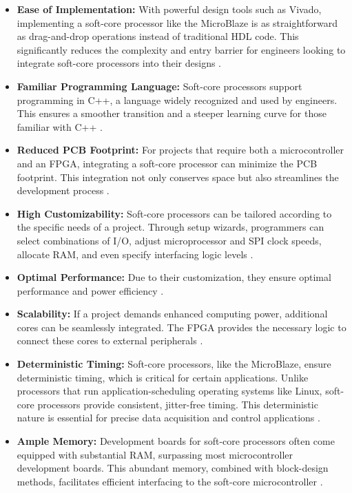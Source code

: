 \documentclass[conference]{IEEEtran}
\begin{document}
\begin{itemize}

 
\item \textbf{Ease of Implementation:} With powerful design tools such as Vivado, implementing a soft-core processor like the MicroBlaze is as straightforward as drag-and-drop operations instead of traditional HDL code. This significantly reduces the complexity and entry barrier for engineers looking to integrate soft-core processors into their designs \cite{3}.

\item \textbf{Familiar Programming Language:} Soft-core processors support programming in C++, a language widely recognized and used by engineers. This ensures a smoother transition and a steeper learning curve for those familiar with C++ \cite{3}.

\item \textbf{Reduced PCB Footprint:} For projects that require both a microcontroller and an FPGA, integrating a soft-core processor can minimize the PCB footprint. This integration not only conserves space but also streamlines the development process \cite{3}.

\item \textbf{High Customizability:} Soft-core processors can be tailored according to the specific needs of a project. Through setup wizards, programmers can select combinations of I/O, adjust microprocessor and SPI clock speeds, allocate RAM, and even specify interfacing logic levels \cite{3}.
    \item \textbf{Optimal Performance:} Due to their customization, they ensure optimal performance and power efficiency \cite{3}.

\item \textbf{Scalability:} If a project demands enhanced computing power, additional cores can be seamlessly integrated. The FPGA provides the necessary logic to connect these cores to external peripherals \cite{3}.

\item \textbf{Deterministic Timing:} Soft-core processors, like the MicroBlaze, ensure deterministic timing, which is critical for certain applications. Unlike processors that run application-scheduling operating systems like Linux, soft-core processors provide consistent, jitter-free timing. This deterministic nature is essential for precise data acquisition and control applications \cite{3}.

\item \textbf{Ample Memory:} Development boards for soft-core processors often come equipped with substantial RAM, surpassing most microcontroller development boards. This abundant memory, combined with block-design methods, facilitates efficient interfacing to the soft-core microcontroller \cite{3}.


\end{itemize}
\end{document}
